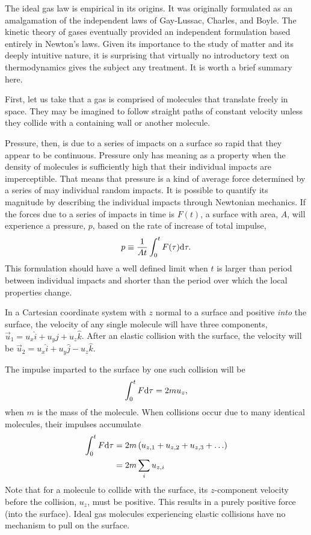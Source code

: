 The ideal gas law is empirical in its origins.  It was originally formulated as an amalgamation of the independent laws of Gay-Lussac, Charles, and Boyle.  The kinetic theory of gases eventually provided an independent formulation based entirely in Newton's laws.  Given its importance to the study of matter and its deeply intuitive nature, it is surprising that virtually no introductory text on thermodynamics gives the subject any treatment.  It is worth a brief summary here.

First, let us take that a gas is comprised of molecules that translate freely in space.  They may be imagined to follow straight paths of constant velocity unless they collide with a containing wall or another molecule.  

Pressure, then, is due to a series of impacts on a surface so rapid that they appear to be continuous.  Pressure only has meaning as a property when the density of molecules is sufficiently high that their individual impacts are imperceptible.  That means that pressure is a kind of average force determined by a series of may individual random impacts.  It is possible to quantify its magnitude by describing the individual impacts through Newtonian mechanics.  If the forces due to a series of impacts in time is $F(t)$, a surface with area, $A$, will experience a pressure, $p$, based on the rate of increase of total impulse,
\begin{align}
p \equiv \frac{1}{A t} \int_0^t F(\tau) \mathrm{d} \tau.
\end{align}
This formulation should have a well defined limit when $t$ is larger than period between individual impacts and shorter than the period over which the local properties change.

In a Cartesian coordinate system with $z$ normal to a surface and positive \emph{into} the surface, the velocity of any single molecule will have three components, $\vec{u}_1 = u_x \hat{i} + u_y \hat{j} + u_z \hat{k}$.  After an elastic collision with the surface, the velocity will be $\vec{u}_2 = u_x \hat{i} + u_y \hat{j} - u_z \hat{k}$.

The impulse imparted to the surface by one such collision will be
\begin{align}
\int_0^t F \mathrm{d} \tau = 2 m u_z,
\end{align}
when $m$ is the mass of the molecule.  When collisions occur due to many identical molecules, their impulses accumulate
\begin{align}
\int_0^t F \mathrm{d} \tau &= 2 m \left( u_{z,1} + u_{z,2} + u_{z,3} + \ldots \right)\nonumber\\
  &= 2 m \sum_i u_{z,i}
\end{align}
Note that for a molecule to collide with the surface, its $z$-component velocity before the collision, $u_z$, must be positive.  This results in a purely positive force (into the surface).  Ideal gas molecules experiencing elastic collisions have no mechanism to pull on the surface.

